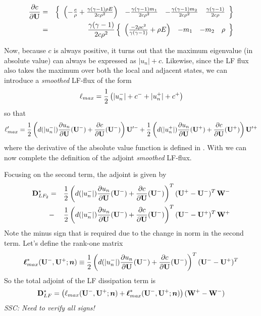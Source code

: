 \documentclass[12pt]{article}
\begin{document}
\begin{eqnarray}
\frac{\partial c}{\partial {{\bf U}}} &=& 
\left\{
\begin{array}{cccc}
\left(-\frac{c}{\rho}+\frac{\gamma(\gamma-1)\rho E}{2c\rho^2}\right) &
-\frac{\gamma(\gamma-1)m_1}{2c\rho^2} &
-\frac{\gamma(\gamma-1)m_2}{2c\rho^2} &
\frac{\gamma(\gamma-1)}{2c\rho}
\end{array}
\right\} \nonumber\\
&=& 
\frac{\gamma(\gamma-1)}{2c\rho^2}
\left\{
\begin{array}{cccc}
\left(\frac{-2\rho c^2}{\gamma(\gamma-1)}+\rho E\right) & -m_1 & -m_2 & \rho
\end{array}
\right\}
\end{eqnarray}

Now, because $c$ is always positive, it turns out that the maximum eigenvalue
(in absolute value) can always be expressed as $|u_n|+c$.  Likewise, since the
LF flux also takes the maximum over both the local and adjacent states, we can
introduce a {\em smoothed} LF-flux of the form
\begin{equation}
\ell_{max} = \frac{1}{2}\left( |u^-_n| + c^- + |u^+_n| + c^+ \right)
\end{equation}
so that
\begin{equation} \label{e:lmax_prime}
\ell'_{max} = 
  \frac{1}{2}\left( d(|u^-_n|)\frac{\partial u_n}{\partial{{\bf U}}}({{\bf U}}^-) +
  \frac{\partial c}{\partial {{\bf U}}}({{\bf U}}^-)\right){{\bf U}}'^- +
  \frac{1}{2}\left( d(|u^+_n|)\frac{\partial u_n}{\partial{{\bf U}}}({{\bf U}}^+) +
  \frac{\partial c}{\partial {{\bf U}}}({{\bf U}}^+)\right){{\bf U}}'^+
\end{equation}
where the derivative of the absolute value function is defined in
.  With  we can now complete the definition of
the adjoint {\em smoothed} LF-flux.

Focusing on the second term, the adjoint is given by
\begin{eqnarray}
{\bf D}^*_{LF_2} &=&  
  \frac{1}{2}\left( d(|u^-_n|)\frac{\partial u_n}{\partial{{\bf U}}}({{\bf U}}^-) +
  \frac{\partial c}{\partial {{\bf U}}}({{\bf U}}^-)\right)^T ({{\bf U}}^+-{{\bf U}}^-)^T \,{\bf W}^- 
  \nonumber\\  &-& 
  \frac{1}{2}\left( d(|u^-_n|)\frac{\partial u_n}{\partial{{\bf U}}}({{\bf U}}^-) +
  \frac{\partial c}{\partial {{\bf U}}}({{\bf U}}^-)\right)^T ({{\bf U}}^--{{\bf U}}^+)^T \,{\bf W}^+
\end{eqnarray}
Note the minus sign that is required due to the change in norm in the second
term.  Let's define the rank-one matrix
\begin{equation}
 {\boldsymbol\ell}^*_{max}({{\bf U}}^-,{{\bf U}}^+;{\boldsymbol n}) \equiv 
  \frac{1}{2}\left( d(|u^-_n|)\frac{\partial u_n}{\partial{{\bf U}}}({{\bf U}}^-) +
  \frac{\partial c}{\partial {{\bf U}}}({{\bf U}}^-)\right)^T ({{\bf U}}^--{{\bf U}}^+)^T
\end{equation}
So the total adjoint of the LF dissipation term is
\begin{eqnarray}
{\bf D}^*_{LF} = \left( \ell_{max}({{\bf U}}^-,{{\bf U}}^+;{\boldsymbol n}) + 
             {\boldsymbol\ell}^*_{max}({{\bf U}}^-,{{\bf U}}^+;{\boldsymbol n}) \right) 
             ({\bf W}^+ - {\bf W}^-)
\end{eqnarray}
{\em SSC:  Need to verify all signs!}
\end{document}
